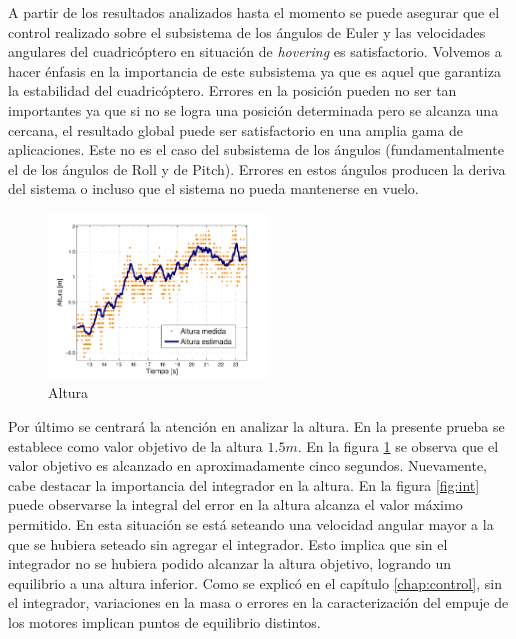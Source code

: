 \documentclass[main]{subfiles}
\begin{document}
A partir de los resultados analizados hasta el momento se puede asegurar que el control realizado sobre el subsistema de los \'angulos de Euler y las velocidades angulares del cuadric\'optero en situaci\'on de \emph{hovering} es satisfactorio. Volvemos a hacer \'enfasis en la importancia de este subsistema ya que es aquel que garantiza la estabilidad del cuadric\'optero. Errores en la posici\'on pueden no ser tan importantes ya que si no se logra una posici\'on determinada pero se alcanza una cercana, el resultado global puede ser satisfactorio en una amplia gama de aplicaciones. Este no es el caso del subsistema de los \'angulos (fundamentalmente el de los \'angulos de Roll y de Pitch). Errores en estos \'angulos producen la deriva del sistema o incluso que el sistema no pueda mantenerse en vuelo. \\
\begin{figure}
	\centering
	\vspace{-10pt}
	\includegraphics[width=0.52\textwidth]{./pics_test_control/z.pdf}
	\caption{Altura}
	\label{fig:z}
\end{figure}

Por último se centrará la atención en analizar la altura. En la presente prueba se establece como valor objetivo de la altura $1.5m$. En la figura \ref{fig:z} se observa que el valor objetivo es alcanzado en aproximadamente cinco segundos. Nuevamente, cabe destacar la importancia del integrador en la altura. En la figura \ref{fig:int} puede observarse la integral del error en la altura alcanza el valor m\'aximo permitido. En esta situaci\'on se est\'a seteando una velocidad angular mayor a la que se hubiera seteado sin agregar el integrador. Esto implica que sin el integrador no se hubiera podido alcanzar la altura objetivo, logrando un equilibrio a una altura inferior. Como se explic\'o en el cap\'itulo \ref{chap:control}, sin el integrador, variaciones en la masa o errores en la caracterizaci\'on del empuje de los motores implican puntos de equilibrio distintos. \\
\end{document}
